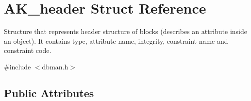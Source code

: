 \hypertarget{structAK__header}{\section{A\+K\+\_\+header Struct Reference}
\label{structAK__header}
}


Structure that represents header structure of blocks (describes an attribute inside an object). It contains type, attribute name, integrity, constraint name and constraint code.  




{\ttfamily \#include $<$dbman.\+h$>$}

\subsection*{Public Attributes}
